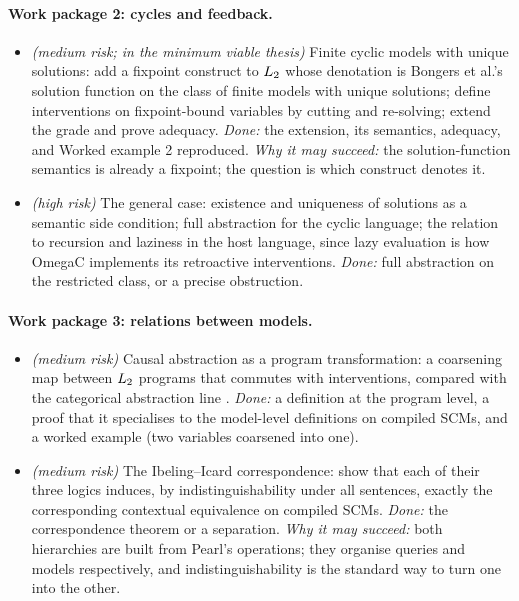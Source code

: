 \paragraph{Work package 2: cycles and feedback.}
\begin{itemize}[nosep]
\item[2a] \textit{(medium risk; in the minimum viable thesis)} Finite cyclic models with unique solutions: add a fixpoint construct to $L_{2}$ whose denotation is Bongers et al.'s solution function on the class of finite models with unique solutions; define interventions on fixpoint-bound variables by cutting and re-solving; extend the grade and prove adequacy. \emph{Done:} the extension, its semantics, adequacy, and Worked example 2 reproduced. \emph{Why it may succeed:} the solution-function semantics is already a fixpoint; the question is which construct denotes it.
\item[2b] \textit{(high risk)} The general case: existence and uniqueness of solutions as a semantic side condition; full abstraction for the cyclic language; the relation to recursion and laziness in the host language, since lazy evaluation is how OmegaC implements its retroactive interventions. \emph{Done:} full abstraction on the restricted class, or a precise obstruction.
\end{itemize}

\paragraph{Work package 3: relations between models.}
\begin{itemize}[nosep]
\item[3a] \textit{(medium risk)} Causal abstraction as a program transformation: a coarsening map between $L_{2}$ programs that commutes with interventions, compared with the categorical abstraction line \cite{rischel2021abstraction,lorenztull2026abstraction,englberger2025causalabstractionscategoricallyunified}. \emph{Done:} a definition at the program level, a proof that it specialises to the model-level definitions on compiled SCMs, and a worked example (two variables coarsened into one).
\item[3b] \textit{(medium risk)} The Ibeling--Icard correspondence: show that each of their three logics induces, by indistinguishability under all sentences, exactly the corresponding contextual equivalence on compiled SCMs. \emph{Done:} the correspondence theorem or a separation. \emph{Why it may succeed:} both hierarchies are built from Pearl's operations; they organise queries and models respectively, and indistinguishability is the standard way to turn one into the other.
\end{itemize}

